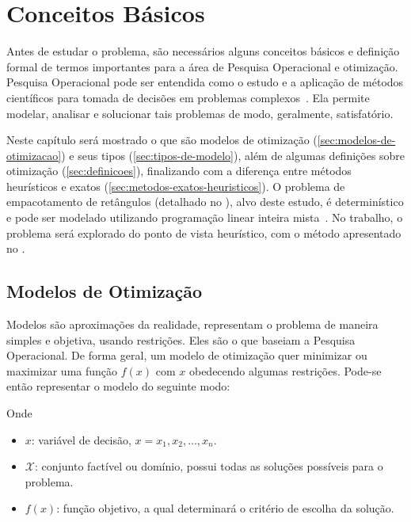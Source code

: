 \chapter{Conceitos Básicos}\label{ch:conceitos-basicos}


Antes de estudar o problema, são necessários alguns conceitos básicos e definição formal de termos
importantes para a área de Pesquisa Operacional e otimização.
Pesquisa Operacional pode ser entendida como o estudo e a aplicação de métodos científicos para
tomada de decisões em problemas complexos~\cite[p.IX]{arenales}.
Ela permite modelar, analisar e solucionar tais problemas de modo, geralmente, satisfatório.

Neste capítulo será mostrado o que são modelos de otimização (\autoref{sec:modelos-de-otimizacao})
e seus tipos (\autoref{sec:tipos-de-modelo}), além de algumas definições sobre otimização
(\autoref{sec:definicoes}), finalizando com a diferença entre métodos heurísticos e exatos
(\cref{sec:metodos-exatos-heuristicos}).
O problema de empacotamento de retângulos (detalhado no ),
alvo deste estudo, é determinístico e pode ser modelado utilizando programação linear inteira
mista~\cite{wolsey2020integer}.
No trabalho, o problema será explorado do ponto de vista heurístico, com o método apresentado no
.


\section{Modelos de Otimização}\label{sec:modelos-de-otimizacao}

Modelos são aproximações da realidade, representam o problema de maneira simples e objetiva,
usando restrições.
Eles são o que baseiam a Pesquisa Operacional.
De forma geral, um modelo de otimização quer minimizar ou maximizar uma função $f(x)$ com $x$
obedecendo algumas restrições.
Pode-se então representar o modelo do seguinte modo:



Onde

\begin{itemize}
    \item $x$: variável de decisão, $x = x_1, x_2, \dots, x_n$.
    \item $\mathcal{X}$: conjunto factível ou domínio, possui todas as soluções possíveis para o problema.
    \item $f(x)$: função objetivo, a qual determinará o critério de escolha da solução.
\end{itemize}

